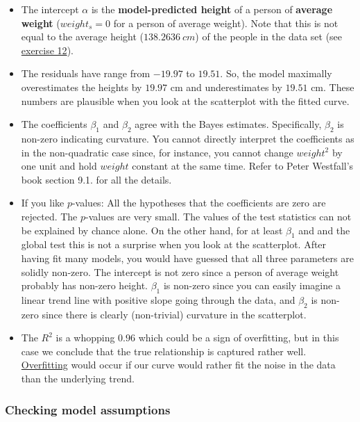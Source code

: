 \documentclass[
]{book}
\providecommand{\tightlist}{%
  \setlength{\itemsep}{0pt}\setlength{\parskip}{0pt}}
\begin{document}
\begin{itemize}
\tightlist
\item
  The intercept \(\alpha\) is the \textbf{model-predicted height} of a person of \textbf{average weight}
  (\(weight_s=0\) for a person of average weight).
  Note that this is not equal to the average height (\(138.2636~cm\)) of the people in the data set
  (see \hyperref[exercise12_multiple_regression]{exercise 12}).
\item
  The residuals have range from \(-19.97\) to \(19.51\). So, the model maximally
  overestimates the heights by \(19.97\) cm and underestimates by \(19.51\) cm.
  These numbers are plausible when you look at the scatterplot with the fitted
  curve.
\item
  The coefficients \(\beta_1\) and \(\beta_2\) agree with the Bayes estimates.
  Specifically, \(\beta_2\) is non-zero indicating curvature. You cannot directly interpret the coefficients
  as in the non-quadratic case since, for instance, you cannot change \(weight^2\) by one unit
  and hold \(weight\) constant at the same time. Refer to Peter Westfall's book section 9.1. for all the details.
\item
  If you like \(p\)-values: All the hypotheses that the coefficients are zero
  are rejected. The \(p\)-values are very small. The values of the test statistics can not be explained
  by chance alone. On the other hand, for at least \(\beta_1\) and
  and the global test this is not a surprise when you look at the scatterplot.
  After having fit many models, you would have guessed that all three parameters
  are solidly non-zero. The intercept is not zero since a person of average weight probably
  has non-zero height. \(\beta_1\) is non-zero since you can easily imagine a linear
  trend line with positive slope going through the data, and \(\beta_2\) is non-zero
  since there is clearly (non-trivial) curvature in the scatterplot.
\item
  The \(R^2\) is a whopping \(0.96\) which could be a sign of overfitting, but
  in this case we conclude that the true relationship is captured rather well.
  \href{https://en.wikipedia.org/wiki/Overfitting}{Overfitting} would occur if
  our curve would rather fit the noise in the data than
  the underlying trend.
\end{itemize}

\subsubsection{Checking model assumptions}\label{checking-model-assumptions}
\end{document}
